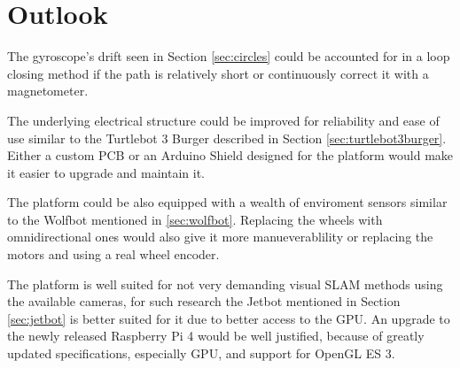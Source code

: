 \documentclass[class=article, crop=false]{standalone}
\begin{document}
\chapter{Outlook}\label{cha:outlook}

The gyroscope's drift seen in Section \ref{sec:circles} could be accounted for in a loop closing method if the path is relatively short or continuously correct it with a magnetometer.

The underlying electrical structure could be improved for reliability and ease of use similar to the Turtlebot 3 Burger described in Section \ref{sec:turtlebot3burger}. Either a custom PCB or an Arduino Shield designed for the platform would make it easier to upgrade and maintain it.

The platform could be also equipped with a wealth of enviroment sensors similar to the Wolfbot mentioned in \ref{sec:wolfbot}. Replacing the wheels with omnidirectional ones would also give it more manueverablility or replacing the motors and using a real wheel encoder.

The platform is well suited for not very demanding visual SLAM methods using the available cameras, for such research the Jetbot mentioned in Section \ref{sec:jetbot} is better suited for it due to better access to the GPU. An upgrade to the newly released Raspberry Pi 4 would be well justified, because of greatly updated specifications, especially GPU, and support for OpenGL ES 3\footnotemark.

\end{document}
